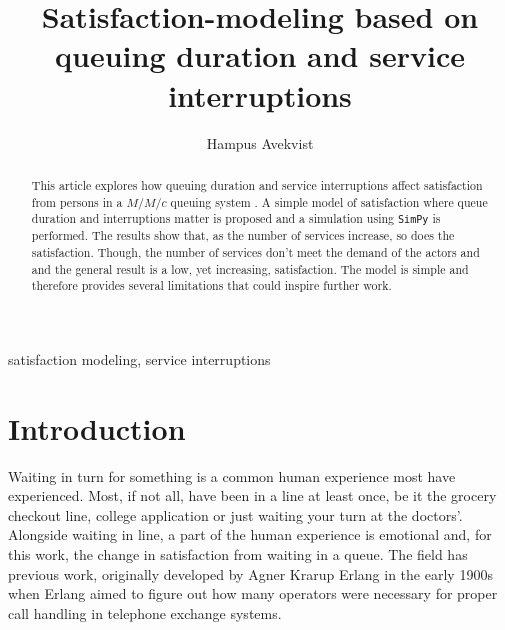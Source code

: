 \documentclass[conference]{IEEEtran}
\begin{document}
\title{Satisfaction-modeling based on queuing duration and service interruptions}

\author{
    Hampus Avekvist \\
}

\maketitle

\begin{abstract}
    This article explores how queuing duration and service
    interruptions affect satisfaction from persons in a $M/M/c$
    queuing system \cite{ChukovaUcarQueuingSystems}. A simple model
    of satisfaction where queue duration and interruptions matter
    is proposed and a simulation using \verb|SimPy| \cite{SimPy}
    is performed. The results show that, as the number of services
    increase, so does the satisfaction. Though, the number of
    services don't meet the demand of the actors and and the
    general result is a low, yet increasing, satisfaction. The
    model is simple and therefore provides several limitations that
    could inspire further work.
\end{abstract}

\begin{IEEEkeywords}
    satisfaction modeling, service interruptions
\end{IEEEkeywords}

\section{Introduction}

Waiting in turn for something is a common human experience most
have experienced. Most, if not all, have been in a line at least
once, be it the grocery checkout line, college application or
just waiting your turn at the doctors'. Alongside waiting in line,
a part of the human experience is emotional and, for this work,
the change in satisfaction from waiting in a queue. The field
has previous work, originally developed by Agner Krarup Erlang
\cite{ErlangSandsynlighedsregning, NeuroLaunchMakingSomeoneWait}
in the early 1900s when Erlang aimed to figure out how many
operators were necessary for proper call handling in telephone
exchange systems.
\end{document}
